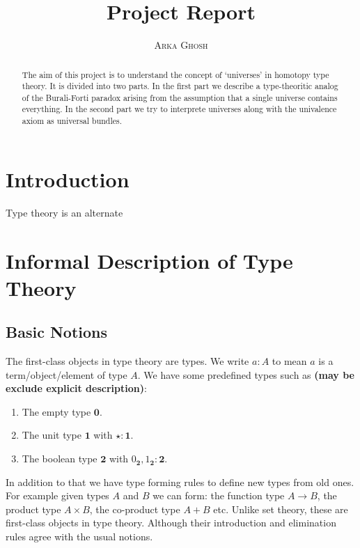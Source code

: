 \documentclass[10pt]{article}
\title{\bf{Project Report}}
\author{\textsc{Arka Ghosh}}
\theoremstyle{definition}
\theoremstyle{plain}
\theoremstyle{remark}
\begin{document}
\begin{titlepage}

\maketitle

\tableofcontents

\begin{abstract}
The aim of this project is to understand the concept of `universes' in homotopy type theory.
It is divided into two parts. In the first part we describe a type-theoritic analog of the
Burali-Forti paradox arising from the assumption that a single universe contains everything.
In the second part we try to interprete universes along with the univalence axiom as 
universal bundles.
\end{abstract}

\end{titlepage}


\section{Introduction}\label{Intro}
Type theory is an alternate

\section{Informal Description of Type Theory}

\subsection{Basic Notions}

The first-class objects in type theory are types.  We write $a : A$ to mean $a$ is a 
term/object/element of type $A$. We have some predefined types such as \textbf{(may be exclude
explicit description)}:
\begin{enumerate}
\item The empty type $\mathbf{0}$.
\item The unit type $\mathbf{1}$ with $\star : \mathbf{1}$.
\item The boolean type $\mathbf{2}$ with $0_{\mathbf{2}}, 1_{\mathbf{2}} : \mathbf{2}$.  
\end{enumerate}
In addition to that we have type forming rules to define new types from old ones. For example
given types $A$ and $B$ we can form: the function type $A \to B$, the product type 
$A \times B$, the co-product type $A + B$ etc. Unlike set theory, these are first-class 
objects in type theory. Although their introduction and elimination rules agree with the 
usual notions.\smallskip
\end{document}
